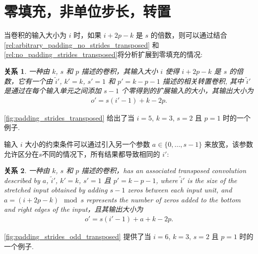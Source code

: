 \documentclass[notitlepage]{ctexrep}
\newtheorem{relationship}{关系}
\begin{document}
\section{零填充，非单位步长，转置} 

当卷积的输入大小为 $i$ 时，如果 $i + 2p - k$ 是 $s$ 的倍数，则可以通过结合
\autoref{rel:arbitrary_padding_no_strides_transposed} 和
\autoref{rel:no_padding_strides_transposed}将分析扩展到零填充的情况:

\begin{relationship}\label{rel:padding_strides_transposed}
一种由 $k$, $s$ 和 $p$ 描述的卷积，其输入大小 $i$ 使得 $i + 2p - k$ 是 $s$ 的倍数，它有一个由 $\tilde{i}'$, $k' = k$, $s' = 1$ 和 $p' = k - p - 1$ 描述的相关转置卷积, 其中 $\tilde{i}'$ 是通过在每个输入单元之间添加 $s - 1$ 个零得到的扩展输入的大小，其输出大小为
\begin{equation*}
\begin{split}
    o' = s (i' - 1) + k - 2p.
\end{split}
\end{equation*}
\end{relationship}

\autoref{fig:padding_strides_transposed} 给出了当 $i = 5$, $k =
3$, $s = 2$ 且 $p = 1$ 时的一个例子.

输入 $i$ 大小的约束条件可以通过引入另一个参数 $a \in \{0, \ldots, s - 1\}$ 来放宽，该参数允许区分在$s$不同的情况下，所有结果都导致相同的 $i'$:

\begin{relationship}\label{rel:padding_strides_transposed_odd}
一种由 $k$, $s$ 和 $p$ 描述的卷积，has an
associated transposed convolution described by $a$, $\tilde{i}'$, $k' = k$, $s' = 1$ 且 $p' = k - p - 1$, where $\tilde{i}'$ is the size of the stretched
input obtained by adding $s - 1$ zeros between each input unit, and $a = (i +
2p - k) \mod s$ represents the number of zeros added to the bottom and right edges
of the input，且其输出大小为
\begin{equation*}
\begin{split}
    o' = s (i' - 1) + a + k - 2p.
\end{split}
\end{equation*}
\end{relationship}

\autoref{fig:padding_strides_odd_transposed} 提供了当 $i = 6$, $k
= 3$, $s = 2$ 且 $p = 1$ 时的一个例子.
\end{document}
